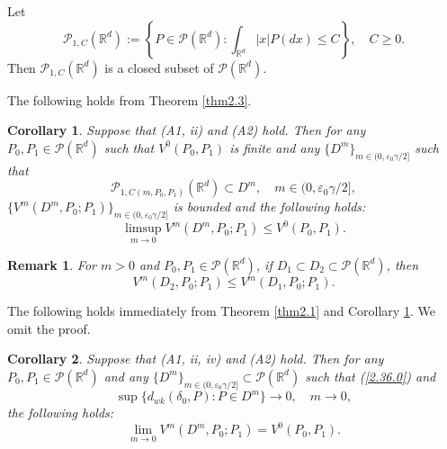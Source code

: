 \documentclass[12pt]{article}
\newtheorem{remark}{Remark}[section]
\newtheorem{corollary}{Corollary}[section]
\begin{document}
Let 
$$\mathcal{P}_{1,C}(\mathbb{R}^d ):=\left\{P\in \mathcal{P}(\mathbb{R}^d ):\int_{\mathbb{R}^d}|x|P(dx)\le C\right\}, \quad  C\ge 0.$$
Then $\mathcal{P}_{1,C}(\mathbb{R}^d )$ is a closed subset of $\mathcal{P}(\mathbb{R}^d )$.

The following holds from Theorem \ref{thm2.3}.

\begin{corollary}\label{thm2.2}
Suppose that (A1, ii) and (A2) hold. Then
for any $P_0,P_1\in \mathcal{P}(\mathbb{R}^d )$ such that $V^0(P_0,P_1)$ is finite
and any $\{D^m\}_{m\in (0, \varepsilon_0\gamma/2]}$ such that 
\begin{equation}\label{2.36.0}
\mathcal{P}_{1,C(m,P_0,P_1)}(\mathbb{R}^d ) \subset D^m, \quad m\in (0, \varepsilon_0\gamma/2],
\end{equation}
$\{V^m(D^m,P_0;P_1)\}_{m\in (0, \varepsilon_0\gamma/2]}$ is bounded and the following holds: 
\begin{equation}\label{2.26}
\limsup_{m\to 0}V^m(D^m,P_0;P_1)\le V^0(P_0,P_1).
\end{equation}
\end{corollary}

\begin{remark}\label{rk2.5}
For $m>0$ and $P_0,P_1\in \mathcal{P}(\mathbb{R}^d )$,
if $D_1\subset D_2\subset \mathcal{P}(\mathbb{R}^d )$, then 
\begin{equation}
V^m(D_2,P_0;P_1)\le V^m(D_1,P_0;P_1).
\end{equation}
\end{remark}

The following holds immediately from Theorem \ref {thm2.1} and Corollary \ref{thm2.2}.
We omit the proof.

\begin{corollary}\label{co2.1}
Suppose that (A1, ii, iv) and (A2) hold.
Then for any $P_0,P_1\in\mathcal{P}(\mathbb{R}^d)$ and 
any $\{D^m
\}_{m\in (0, \varepsilon_0\gamma/2]}\subset \mathcal{P}(\mathbb{R}^d)$ such that (\ref{2.36.0}) and 
\begin{equation}\label{2.39}
\sup\{d_{wk}(\delta_0, P): P\in D^m\}\to 0, \quad m\to 0,
\end{equation}
the following holds:
\begin{equation}
\lim_{m\to  0}V^{m}(D^m,P_0;P_1)=V^0(P_0,P_1).
\end{equation}
\end{corollary}
\end{document}
